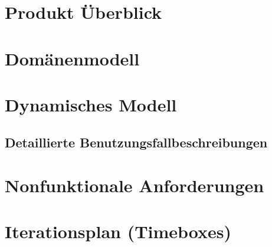 \documentclass[10pt,a4paper,titlepage]{article}
\begin{document}
\newpage

\section{Produkt Überblick}

\newpage

\section{Domänenmodell}

\newpage

\section{Dynamisches Modell}
\subsection{Detaillierte Benutzungsfallbeschreibungen}












\newpage

\section{Nonfunktionale Anforderungen}

\newpage

\section{Iterationsplan (Timeboxes)}

\newpage

\printglossary[title=Glossar,toctitle=GLOSSAR]
\end{document}
